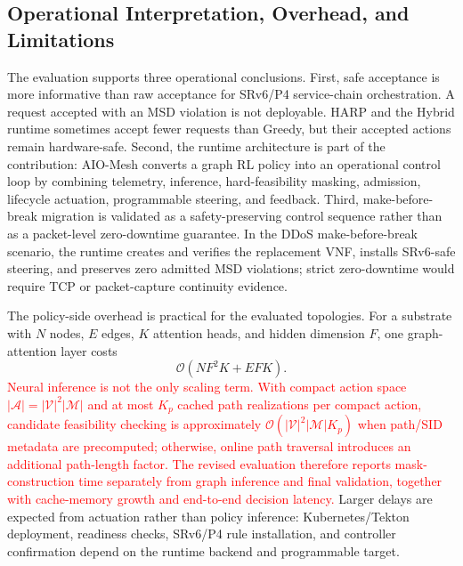\documentclass[final,5p]{elsarticle}
\newcommand{\rev}[1]{\textcolor{red}{#1}}
\begin{document}
\subsection{Operational Interpretation, Overhead, and Limitations}
\label{subsec:operational_interpretation}

The evaluation supports three operational conclusions. First, safe acceptance is more informative than raw acceptance for SRv6/P4 service-chain orchestration. A request accepted with an MSD violation is not deployable. HARP and the Hybrid runtime sometimes accept fewer requests than Greedy, but their accepted actions remain hardware-safe. Second, the runtime architecture is part of the contribution: AIO-Mesh converts a graph RL policy into an operational control loop by combining telemetry, inference, hard-feasibility masking, admission, lifecycle actuation, programmable steering, and feedback. Third, make-before-break migration is validated as a safety-preserving control sequence rather than as a packet-level zero-downtime guarantee. In the DDoS make-before-break scenario, the runtime creates and verifies the replacement VNF, installs SRv6-safe steering, and preserves zero admitted MSD violations; strict zero-downtime would require TCP or packet-capture continuity evidence.

The policy-side overhead is practical for the evaluated topologies. For a substrate with \(N\) nodes, \(E\) edges, \(K\) attention heads, and hidden dimension \(F\), one graph-attention layer costs
\begin{equation}
    \mathcal{O}(NF^2K + EFK).
\end{equation}
\rev{Neural inference is not the only scaling term. With compact action space \(|\mathcal{A}|=|\mathcal{V}|^2|\mathcal{M}|\) and at most \(K_p\) cached path realizations per compact action, candidate feasibility checking is approximately \(\mathcal{O}(|\mathcal{V}|^2|\mathcal{M}|K_p)\) when path/SID metadata are precomputed; otherwise, online path traversal introduces an additional path-length factor. The revised evaluation therefore reports mask-construction time separately from graph inference and final validation, together with cache-memory growth and end-to-end decision latency.} Larger delays are expected from actuation rather than policy inference: Kubernetes/Tekton deployment, readiness checks, SRv6/P4 rule installation, and controller confirmation depend on the runtime backend and programmable target.
\end{document}
